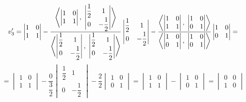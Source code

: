 \documentclass[12pt]{article}
\begin{document}
\[v_{3}' = \begin{vmatrix} 1&0 \\ 1&1 \end{vmatrix} - \dfrac{\left\langle\begin{vmatrix} 1&0 \\ 1&1 \end{vmatrix},\;\begin{vmatrix} \dfrac{1}{2}&1 \\ 0&-\dfrac{1}{2} \end{vmatrix}\right\rangle}{\left\langle\begin{vmatrix} \dfrac{1}{2}&1 \\ 0&-\dfrac{1}{2} \end{vmatrix},\;\begin{vmatrix} \dfrac{1}{2}&1 \\ 0&-\dfrac{1}{2} \end{vmatrix}\right\rangle}\begin{vmatrix} \dfrac{1}{2}&1 \\ 0&-\dfrac{1}{2} \end{vmatrix} - \dfrac{\left\langle\begin{vmatrix} 1&0 \\ 1&1 \end{vmatrix},\;\begin{vmatrix} 1&0 \\ 0&1 \end{vmatrix}\right\rangle}{\left\langle\begin{vmatrix} 1&0 \\ 0&1 \end{vmatrix},\;\begin{vmatrix} 1&0 \\ 0&1 \end{vmatrix}\right\rangle}\begin{vmatrix} 1&0 \\ 0&1 \end{vmatrix} =\]
\[= \begin{vmatrix} 1&0 \\ 1&1 \end{vmatrix} - \dfrac{0}{\dfrac{3}{2}}\begin{vmatrix} \dfrac{1}{2}&1 \\ 0&-\dfrac{1}{2} \end{vmatrix} - \dfrac{2}{2}\begin{vmatrix} 1&0 \\ 0&1 \end{vmatrix} = \begin{vmatrix} 1&0 \\ 1&1 \end{vmatrix} - \begin{vmatrix} 1&0 \\ 0&1 \end{vmatrix} = \begin{vmatrix} 0&0 \\ 1&0 \end{vmatrix}\]
\end{document}
